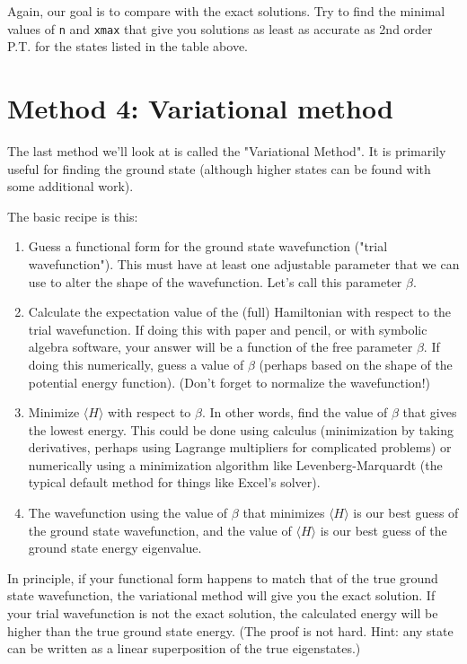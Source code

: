 \documentclass[fontsize=11pt,paper=letter,twoside=false,onecolumn]{article} %
\begin{document}
Again, our goal is to compare with the exact solutions.
Try to find the minimal values of \texttt{n} and \texttt{xmax} that give you solutions as least as accurate as 2nd order P.T. for the states listed in the table above.

\section{Method 4: Variational method}
The last method we'll look at is called the "Variational Method".
It is primarily useful for finding the ground state (although higher states can be found with some additional work).

The basic recipe is this:

\begin{enumerate}
    \item Guess a functional form for the ground state wavefunction ("trial wavefunction").  This must have at least one adjustable parameter that we can use to alter the shape of the wavefunction.
    Let's call this parameter $\beta$.
    \item Calculate the expectation value of the (full) Hamiltonian with respect to the trial wavefunction.  If doing this with paper and pencil, or with symbolic algebra software, your answer will be a function of the free parameter $\beta$.  If doing this numerically, guess a value of $\beta$ (perhaps based on the shape of the potential energy function).  (Don't forget to normalize the wavefunction!)
    \item Minimize $\langle H \rangle$ with respect to $\beta$.  In other words, find the value of $\beta$ that gives the lowest energy.  This could be done using calculus (minimization by taking derivatives, perhaps using Lagrange multipliers for complicated problems) or numerically using a minimization algorithm like Levenberg-Marquardt (the typical default method for things like Excel's solver).
    \item The wavefunction using the value of $\beta$ that minimizes $\langle H \rangle$ is our best guess of the ground state wavefunction, and the value of $\langle H \rangle$ is our best guess of the ground state energy eigenvalue.
\end{enumerate}

In principle, if your functional form happens to match that of the true ground state wavefunction, the variational method will give you the exact solution.  If your trial wavefunction is not the exact solution, the calculated energy will be higher than the true ground state energy. (The proof is not hard.  Hint: any state can be written as a linear superposition of the true eigenstates.)
\end{document}
